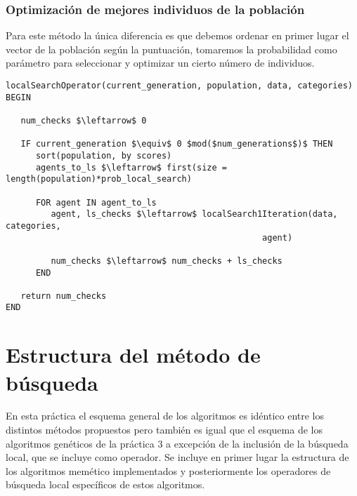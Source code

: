 \documentclass[11pt,leqno]{article}
\begin{document}
\subsubsection{Optimización de mejores individuos de la población}

Para este método la única diferencia es que debemos ordenar en primer lugar el vector de la población según la puntuación, tomaremos la probabilidad como parámetro para seleccionar y optimizar un cierto número de individuos.

\begin{lstlisting}[mathescape=true] 
localSearchOperator(current_generation, population, data, categories) BEGIN
   
   num_checks $\leftarrow$ 0
   
   IF current_generation $\equiv$ 0 $mod($num_generations$)$ THEN
      sort(population, by scores)
      agents_to_ls $\leftarrow$ first(size = length(population)*prob_local_search)
                                       
      FOR agent IN agent_to_ls
         agent, ls_checks $\leftarrow$ localSearch1Iteration(data, categories, 
                                                   agent)
         
         num_checks $\leftarrow$ num_checks + ls_checks
      END
   
   return num_checks
END
\end{lstlisting}

\section{Estructura del método de búsqueda}

En esta práctica el esquema general de los algoritmos es idéntico entre los distintos métodos propuestos pero también es igual que el esquema de los algoritmos genéticos de la práctica 3 a excepción de la inclusión de la búsqueda local, que se incluye como operador. Se incluye en primer lugar la estructura de los algoritmos memético implementados y posteriormente los operadores de búsqueda local específicos de estos algoritmos.
	
\end{document}
